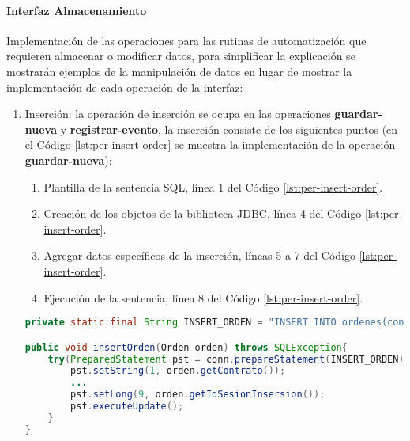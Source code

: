 \paragraph{\indent Interfaz Almacenamiento\\}
Implementación de las operaciones para las rutinas de automatización que requieren almacenar o modificar datos, para simplificar la explicación se mostrarán ejemplos de la manipulación de datos en lugar de mostrar la implementación de cada operación de la interfaz:
\begin{enumerate}
	\item Inserción: la operación de inserción se ocupa en las operaciones \textbf{guardar-nueva} y \textbf{registrar-evento}, la inserción consiste de los siguientes puntos (en el Código \ref{lst:per-insert-order} se muestra la implementación de la operación \textbf{guardar-nueva}):
	\begin{enumerate}
		\item Plantilla de la sentencia SQL, línea 1 del Código \ref{lst:per-insert-order}.
		\item Creación de los objetos de la biblioteca JDBC, línea 4 del Código \ref{lst:per-insert-order}.
		\item Agregar datos específicos de la inserción, líneas 5 a 7 del Código \ref{lst:per-insert-order}.
		\item Ejecución de la sentencia, línea 8 del Código \ref{lst:per-insert-order}.
	\end{enumerate}

	\begin{lstlisting}[language=Java, caption={Inserción de una nueva orden de reposición en la base de datos.}, captionpos=b, label={lst:per-insert-order}]
private static final String INSERT_ORDEN = "INSERT INTO ordenes(contrato, solicitud, orden, fecha_expedicion, almacen_destino, url_con, url_env, estatus, id_sesion_insersion, id_sesion_estatus, fecha_estatus) VALUES(?, ?, ?, ?, ?, ?, ?, 1, ?, ?, CURRENT_TIMESTAMP)";

public void insertOrden(Orden orden) throws SQLException{
    try(PreparedStatement pst = conn.prepareStatement(INSERT_ORDEN)){
	    pst.setString(1, orden.getContrato());
	    ...
	    pst.setLong(9, orden.getIdSesionInsersion());
	    pst.executeUpdate();
	}
}
	\end{lstlisting}


\end{enumerate}
